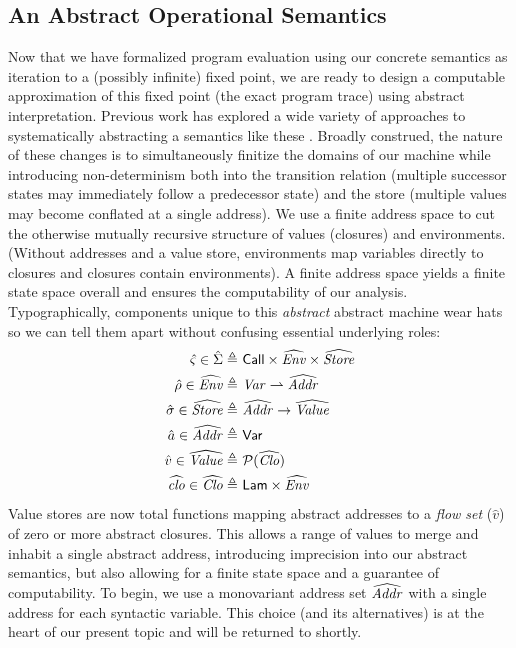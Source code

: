 \subsection{An Abstract Operational Semantics}
\label{sec:aam:abstract}
%
Now that we have formalized program evaluation using our concrete semantics as iteration to a (possibly infinite) fixed point, we are ready to design a 
computable approximation of this fixed point (the exact program trace) using abstract interpretation.
%
Previous work has explored a wide variety of approaches to systematically abstracting a semantics like these 
\cite{might:2010:aam,johnson:2013:oaam,might:2010:free}.
%
Broadly construed, the nature of these changes is to simultaneously finitize the domains of our machine while introducing non-determinism both into the 
transition relation (multiple successor states may immediately follow a predecessor state) and the store (multiple values may become conflated at a single address).
%
We use a finite address space to cut the otherwise mutually recursive structure of values (closures) and environments.
%
(Without addresses and a value store, environments map variables directly to closures and closures contain environments). 
% 
A finite address space yields a finite state space overall and ensures the computability of our analysis.
%
Typographically, components unique to this \textit{abstract} abstract machine wear hats so we can tell them apart without confusing essential underlying roles:
%
\begin{align*}
  \hat{\varsigma} \in \hat{\Sigma} \defas&\ \mathsf{Call} \times \widehat{\var{Env}} \times \widehat{\var{Store}}
  \\
  \hat{\rho} \in \widehat{\var{Env}} \defas&\ \mathsf{\var{Var}} \rightharpoonup \widehat{\var{Addr}}  
  \\
  \hat{\sigma} \in \widehat{\var{Store}} \defas&\ \widehat{\var{Addr}} \rightarrow \widehat{\var{Value}}  
  \\
  \hat{a} \in \widehat{\var{Addr}} \defas&\ \mathsf{Var}
  \\
  \hat{v} \in \widehat{\var{Value}} \defas&\ \mathcal{P}(\widehat{\var{Clo}})  
  \\
  \widehat{\var{clo}} \in \widehat{\var{Clo}} \defas&\ \mathsf{Lam} \times \widehat{\var{Env}} 
\end{align*}
%
Value stores are now total functions mapping abstract addresses to a \textit{flow set} ($\hat{v}$) of zero or more abstract closures. 
%
This allows a range of values to merge and inhabit a single abstract address, introducing imprecision into our abstract semantics, but also allowing
for a finite state space and a guarantee of computability.
%
To begin, we use a monovariant address set $\widehat{\mathit{Addr}}$ with a single address for each syntactic variable.
%
This choice (and its alternatives) is at the heart of our present topic and will be returned to shortly.



